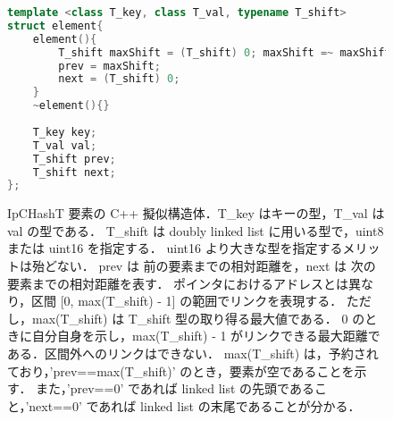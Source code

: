 \begin{figure} %
\begin{lstlisting}[language=C++]
template <class T_key, class T_val, typename T_shift>
struct element{
	element(){
		T_shift maxShift = (T_shift) 0; maxShift =~ maxShift;
		prev = maxShift;
		next = (T_shift) 0;
	}
	~element(){}
	
	T_key key;
	T_val val;
	T_shift prev;
	T_shift next;
};
\end{lstlisting}
\caption{
  IpCHashT 要素の C++ 擬似構造体．T\_key はキーの型，T\_val は val の型である．
  T\_shift は doubly linked list に用いる型で，uint8 または uint16 を指定する．
  uint16 より大きな型を指定するメリットは殆どない．
  prev は 前の要素までの相対距離を，next は 次の要素までの相対距離を表す．
  ポインタにおけるアドレスとは異なり，区間 [0, max(T\_shift) - 1] の範囲でリンクを表現する．
  ただし，max(T\_shift) は T\_shift 型の取り得る最大値である．
  0 のときに自分自身を示し，max(T\_shift) - 1 がリンクできる最大距離である．区間外へのリンクはできない．
  max(T\_shift) は，予約されており，'prev==max(T\_shift)' のとき，要素が空であることを示す．
  また，'prev==0' であれば linked list の先頭であること，'next==0' であれば linked list の末尾であることが分かる．
}
\label{fig_IpCHashT_struct}
\end{figure}


